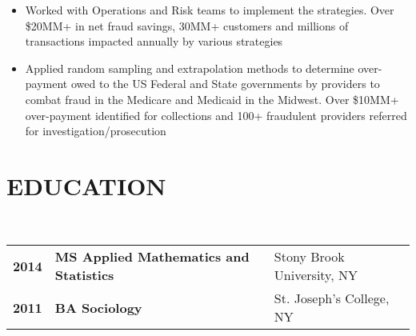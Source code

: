 \documentclass[a4paper,11pt]{article}
\begin{document}
\begin{itemize}
\item Worked with Operations and Risk teams to implement the strategies. Over \$20MM+ in net fraud savings, 30MM+ customers and millions of transactions impacted annually by various strategies
\item Applied random sampling and extrapolation methods to determine over-payment owed to the US Federal and State governments by providers to combat fraud in the Medicare and Medicaid in the Midwest. Over \$10MM+ over-payment identified for collections and 100+ fraudulent providers referred for investigation/prosecution
\end{itemize}


\section{EDUCATION}

~\begin{tabular}{lll}
\textbf{2014} &\textbf{MS Applied Mathematics and Statistics} & Stony Brook University, NY\\
\textbf{2011} &\textbf{ BA Sociology} & St. Joseph's College, NY
\end{tabular}

\enlargethispage*{0.9cm}

\setlength{\bibitemsep}{1.8pt}
\end{document}
